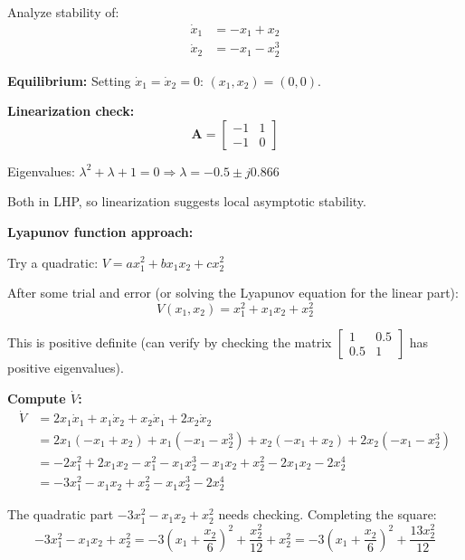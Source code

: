 \begin{example}
\label{ex:lyapunov_nonlinear}
Analyze stability of:
\begin{align}
\dot{x}_1 &= -x_1 + x_2 \\
\dot{x}_2 &= -x_1 - x_2^3
\end{align}

\textbf{Equilibrium:} Setting $\dot{x}_1 = \dot{x}_2 = 0$: $(x_1, x_2) = (0, 0)$.

\textbf{Linearization check:}
\begin{equation}
\mathbf{A} = \begin{bmatrix} -1 & 1 \\ -1 & 0 \end{bmatrix}
\end{equation}

Eigenvalues: $\lambda^2 + \lambda + 1 = 0 \Rightarrow \lambda = -0.5 \pm j0.866$

Both in LHP, so linearization suggests local asymptotic stability.

\textbf{Lyapunov function approach:}

Try a quadratic: $V = ax_1^2 + bx_1x_2 + cx_2^2$

After some trial and error (or solving the Lyapunov equation for the linear part):
\begin{equation}
V(x_1, x_2) = x_1^2 + x_1 x_2 + x_2^2
\end{equation}

This is positive definite (can verify by checking the matrix $\begin{bmatrix} 1 & 0.5 \\ 0.5 & 1 \end{bmatrix}$ has positive eigenvalues).

\textbf{Compute $\dot{V}$:}
\begin{align}
\dot{V} &= 2x_1\dot{x}_1 + x_1\dot{x}_2 + x_2\dot{x}_1 + 2x_2\dot{x}_2 \\
&= 2x_1(-x_1 + x_2) + x_1(-x_1 - x_2^3) + x_2(-x_1 + x_2) + 2x_2(-x_1 - x_2^3) \\
&= -2x_1^2 + 2x_1x_2 - x_1^2 - x_1x_2^3 - x_1x_2 + x_2^2 - 2x_1x_2 - 2x_2^4 \\
&= -3x_1^2 - x_1x_2 + x_2^2 - x_1x_2^3 - 2x_2^4
\end{align}

The quadratic part $-3x_1^2 - x_1x_2 + x_2^2$ needs checking. Completing the square:
\begin{equation}
-3x_1^2 - x_1x_2 + x_2^2 = -3\left(x_1 + \frac{x_2}{6}\right)^2 + \frac{x_2^2}{12} + x_2^2 = -3\left(x_1 + \frac{x_2}{6}\right)^2 + \frac{13x_2^2}{12}
\end{equation}


\end{example}

